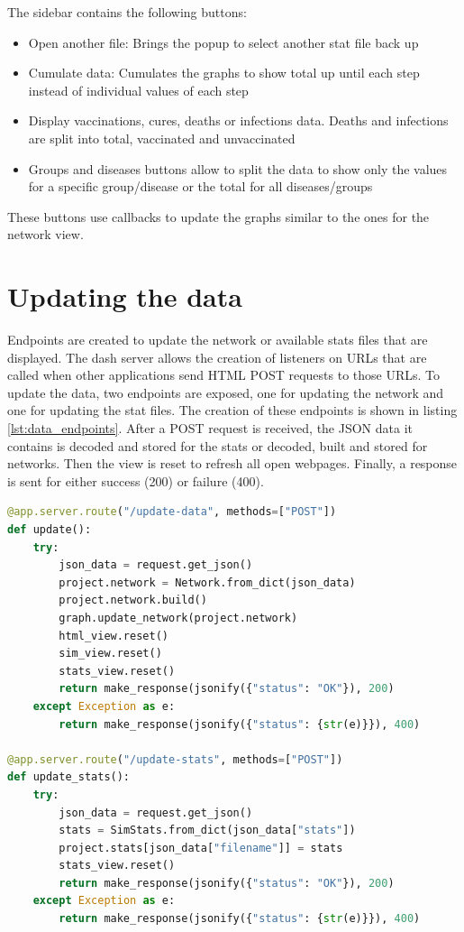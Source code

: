 The sidebar contains the following buttons:
\begin{itemize}
    \item Open another file: Brings the popup to select another stat file back up
    \item Cumulate data: Cumulates the graphs to show total up until each step instead of individual values of each step
    \item Display vaccinations, cures, deaths or infections data. Deaths and infections are split
    into total, vaccinated and unvaccinated
    \item Groups and diseases buttons allow to split the data to show only the values for a specific group/disease
    or the total for all diseases/groups
\end{itemize}
These buttons use callbacks to update the graphs similar to the ones for the network view.

\section{Updating the data}
Endpoints are created to update the network or available stats files that are displayed. The dash server allows the creation of listeners on URLs that are called when other applications send HTML POST requests to those URLs. To update the data, two endpoints are exposed, one for updating the network and one for updating the stat files. The creation of these endpoints is shown in listing \ref{lst:data_endpoints}. After a POST request is received, the JSON data it contains is decoded and stored for the stats or decoded, built and stored for networks. Then the view is reset to refresh all open webpages. Finally, a response is sent for either success (200) or failure (400).

\begin{lstlisting}[language=python, caption={Endpoints for updating data}, label={lst:data_endpoints}]
@app.server.route("/update-data", methods=["POST"])
def update():
    try:
        json_data = request.get_json()
        project.network = Network.from_dict(json_data)
        project.network.build()
        graph.update_network(project.network)
        html_view.reset()
        sim_view.reset()
        stats_view.reset()
        return make_response(jsonify({"status": "OK"}), 200)
    except Exception as e:
        return make_response(jsonify({"status": {str(e)}}), 400)

@app.server.route("/update-stats", methods=["POST"])
def update_stats():
    try:
        json_data = request.get_json()
        stats = SimStats.from_dict(json_data["stats"])
        project.stats[json_data["filename"]] = stats
        stats_view.reset()
        return make_response(jsonify({"status": "OK"}), 200)
    except Exception as e:
        return make_response(jsonify({"status": {str(e)}}), 400)
\end{lstlisting}
